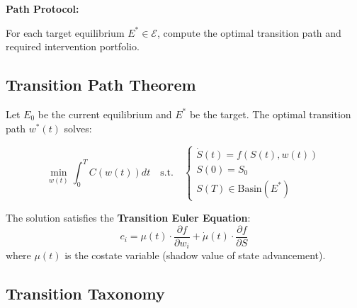 \begin{tcolorbox}[colback=green!5!white, colframe=green!75!black,
    title=Question 3: How Do We Get There?]

\textbf{Path Protocol:}

For each target equilibrium $E^* \in \mathcal{E}$, compute the optimal transition
path and required intervention portfolio.

\end{tcolorbox}

\subsection{Transition Path Theorem}

\begin{theorem}
\label{thm:meq-transition}

Let $E_0$ be the current equilibrium and $E^*$ be the target. The optimal
transition path $w^*(t)$ solves:

\begin{equation}
\boxed{
\min_{w(t)} \int_0^T C(w(t)) dt \quad \text{s.t.} \quad
\begin{cases}
\dot{S}(t) = f(S(t), w(t)) \\
S(0) = S_0 \\
S(T) \in \text{Basin}(E^*)
\end{cases}
}
\end{equation}

The solution satisfies the \textbf{Transition Euler Equation}:
\begin{equation}
c_i = \mu(t) \cdot \frac{\partial f}{\partial w_i} + \dot{\mu}(t) \cdot \frac{\partial f}{\partial S}
\end{equation}
where $\mu(t)$ is the costate variable (shadow value of state advancement).
\end{theorem}

\subsection{Transition Taxonomy}


